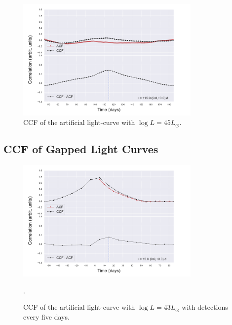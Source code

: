 \documentclass[letterpaper, oneside]{article}
\begin{document}
\begin{figure}[h]
	\centering
	\includegraphics[width=0.8\textwidth]{../CCF_plots/x_y_bands_45_final.pdf}
	\caption{CCF of the artificial light-curve with $\log L = 45 L_{\odot}$.}
	\label{fig:ccf_art_lcs_L45}
\end{figure}

\subsection{CCF of Gapped Light Curves}

\begin{figure}[h]
	\centering
	\includegraphics[width=0.8\textwidth]{../CCF_plots/artificial_x_y_5days.pdf}
	\caption{CCF of the artificial light-curve with $\log L = 43 L_{\odot}$ with detections every five days.}.
	\label{fig:ccf_art_lc_L43_5days}
\end{figure}
\end{document}

